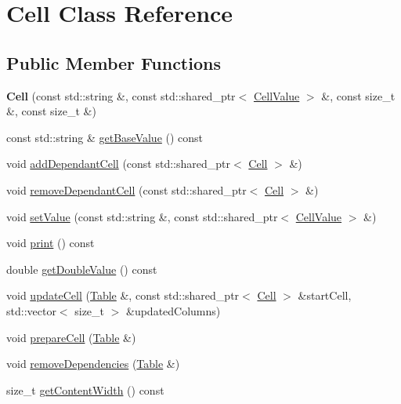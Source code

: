 \hypertarget{classCell}{}\section{Cell Class Reference}
\label{classCell}
\subsection*{Public Member Functions}
\begin{DoxyCompactItemize}
\item 
\mbox{\label{classCell_a9c5b60161f594fa75a90024ccd097cef}} 
{\bfseries Cell} (const std\+::string \&, const std\+::shared\+\_\+ptr$<$ \hyperlink{classCellValue}{Cell\+Value} $>$ \&, const size\+\_\+t \&, const size\+\_\+t \&)
\item 
const std\+::string \& \hyperlink{classCell_a1023dbb5f0feb3990f9c8742a53d42d5}{get\+Base\+Value} () const
\item 
void \hyperlink{classCell_afceadbac4f71834ee2c0add80a3c36fb}{add\+Dependant\+Cell} (const std\+::shared\+\_\+ptr$<$ \hyperlink{classCell}{Cell} $>$ \&)
\item 
void \hyperlink{classCell_a7515c31e889acf8147b739a390b04f56}{remove\+Dependant\+Cell} (const std\+::shared\+\_\+ptr$<$ \hyperlink{classCell}{Cell} $>$ \&)
\item 
void \hyperlink{classCell_a27872e2747e4a5ba9cce8c7e2c8cfb68}{set\+Value} (const std\+::string \&, const std\+::shared\+\_\+ptr$<$ \hyperlink{classCellValue}{Cell\+Value} $>$ \&)
\item 
void \hyperlink{classCell_a0265c2967d02fd1b211728f520f73d42}{print} () const
\item 
double \hyperlink{classCell_a8c28bb1ce92cce3c2440ef1484316e65}{get\+Double\+Value} () const
\item 
void \hyperlink{classCell_acfa77320d94a5897030a9113d6d9cc7e}{update\+Cell} (\hyperlink{classTable}{Table} \&, const std\+::shared\+\_\+ptr$<$ \hyperlink{classCell}{Cell} $>$ \&start\+Cell, std\+::vector$<$ size\+\_\+t $>$ \&updated\+Columns)
\item 
void \hyperlink{classCell_a4fb8248ff66f84e93d72b4c57a8e0e5a}{prepare\+Cell} (\hyperlink{classTable}{Table} \&)
\item 
void \hyperlink{classCell_a7656cf97851d5647e9714c482252801c}{remove\+Dependencies} (\hyperlink{classTable}{Table} \&)
\item 
size\+\_\+t \hyperlink{classCell_ace29a526d062529ece27df47b2e11461}{get\+Content\+Width} () const
\end{DoxyCompactItemize}


